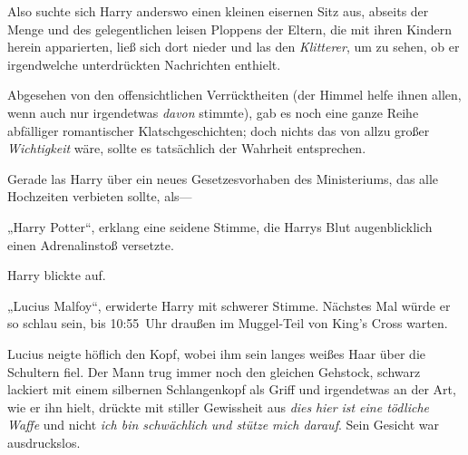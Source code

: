 Also suchte sich Harry anderswo einen kleinen eisernen Sitz aus, abseits der Menge und des gelegentlichen leisen Ploppens der Eltern, die mit ihren Kindern herein apparierten, ließ sich dort nieder und las den \emph{Klitterer}, um zu sehen, ob er irgendwelche unterdrückten Nachrichten enthielt.

Abgesehen von den offensichtlichen Verrücktheiten (der Himmel helfe ihnen allen, wenn auch nur irgendetwas \emph{davon} stimmte), gab es noch eine ganze Reihe abfälliger romantischer Klatschgeschichten; doch nichts das von allzu großer \emph{Wichtigkeit} wäre, sollte es tatsächlich der Wahrheit entsprechen.

Gerade las Harry über ein neues Gesetzesvorhaben des Ministeriums, das alle Hochzeiten verbieten sollte, als—

„Harry Potter“, erklang eine seidene Stimme, die Harrys Blut augenblicklich einen Adrenalinstoß versetzte.

Harry blickte auf.

„Lucius Malfoy“, erwiderte Harry mit schwerer Stimme. Nächstes Mal würde er so schlau sein, bis 10:55~Uhr draußen im Muggel-Teil von King’s Cross warten.

Lucius neigte höflich den Kopf, wobei ihm sein langes weißes Haar über die Schultern fiel. Der Mann trug immer noch den gleichen Gehstock, schwarz lackiert mit einem silbernen Schlangenkopf als Griff und irgendetwas an der Art, wie er ihn hielt, drückte mit stiller Gewissheit aus \emph{dies} \emph{hier} \emph{ist eine tödliche Waffe} und nicht \emph{ich bin schwächlich} \emph{und stütze mich darauf}. Sein Gesicht war ausdruckslos.

